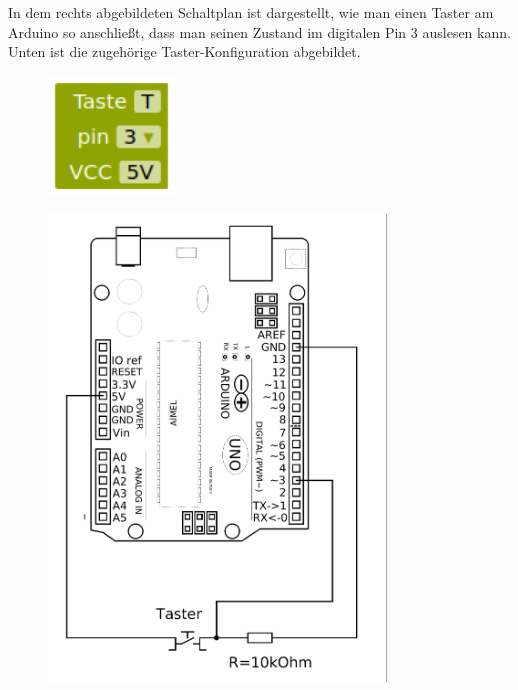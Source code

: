 \begin{minipage}{0.45\textwidth}
	In dem rechts abgebildeten Schaltplan ist dargestellt, wie man einen Taster am Arduino so anschließt, dass man seinen Zustand im digitalen Pin 3 auslesen kann. Unten ist die zugehörige Taster-Konfiguration abgebildet.
	
	\begin{figure}[H]
		\centering
		\includegraphics[width=0.3\textwidth]{./pics/tasterkonfiguration.png}
		\label{abb:tasterkonfiguration}
	\end{figure}

	\bigbreak
	\bigbreak
	\bigbreak
\end{minipage}
\hfill
\begin{minipage}{0.45\textwidth}
	\begin{figure}[H]
		\includegraphics[width=0.8\textwidth]{./Zeichnungen/taster-an-arduino.png}
		\label{abb:schaltplan-taster}
	\end{figure}
\end{minipage}


